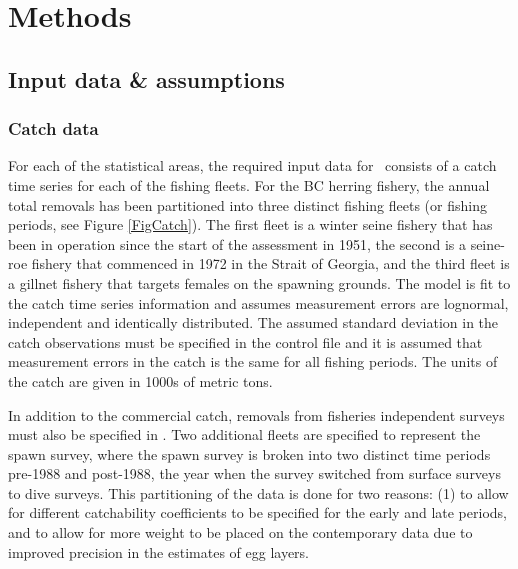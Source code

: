 \section{Methods}
	\subsection{Input data \& assumptions}
	\subsubsection{Catch data}
	For each of the statistical areas, the required input data for \iscam\ consists of a catch time series for each of the fishing fleets.  For the BC herring fishery, the annual total removals has been partitioned into three distinct fishing fleets (or fishing periods, see Figure \ref{FigCatch}).  The first fleet is a winter seine fishery that has been in operation since the start of the assessment in 1951, the second is a seine-roe fishery that commenced in 1972 in the Strait of Georgia, and the third fleet is a gillnet fishery that targets females on the spawning grounds. The model is fit to the catch time series information and assumes measurement errors are lognormal, independent and identically distributed.  The assumed standard deviation in the catch observations must be specified in the control file and it is assumed that measurement errors in the catch is the same for all fishing periods.  The units of the catch are given in 1000s of metric tons.
	
	In addition to the commercial catch, removals from fisheries independent surveys must also be specified in \iscam. Two additional fleets are specified to represent the spawn survey, where the spawn survey is broken into two distinct time periods pre-1988 and post-1988, the year when the survey switched from surface surveys to dive surveys.  This partitioning of the data is done for two reasons: (1) to allow for different catchability coefficients to be specified for the early and late periods, and to allow for more weight to be placed on the contemporary data due to improved precision in the estimates of egg layers. 

	
